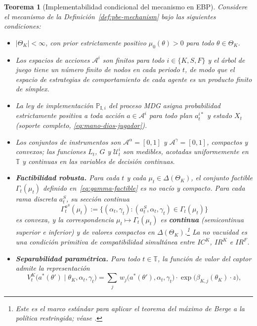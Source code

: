 \documentclass[12pt]{article}
\providecommand{\textcite}{\citet}
\newtheorem{theorem}{Teorema}[section]
\theoremstyle{definition}
\theoremstyle{remark}
\newcommand{\ProbI}[1]{\mathbb{P}_{\mathrm{I},#1}}
\newcommand{\1}{\mathbf{1}}
\begin{document}
\begin{theorem}[Implementabilidad condicional del mecanismo en EBP]
\label{thm:ebp-implementabilidad}
Considere el mecanismo de la Definición~\ref{def:pbe-mechanism} bajo las siguientes condiciones:
\begin{itemize}
  \item[\textup{(i)}] $|\Theta_K|<\infty$, con prior estrictamente positivo $\mu_0(\theta)>0$ para todo $\theta\in\Theta_K$.
  \item[\textup{(ii)}] Los espacios de acciones $\mathcal{A}^i$ son finitos para todo $i\in\{K,S,F\}$ y el árbol de juego tiene un número finito de nodos en cada periodo $t$, de modo que el espacio de estrategias de comportamiento de cada agente es un producto finito de símplex.
  \item[\textup{(iii)}] La ley de implementación $\ProbI{i}$ del proceso MDG asigna probabilidad estrictamente positiva a toda acción $a\in\mathcal{A}^i$ para todo plan $a_t^{i\ast}$ y estado $X_t$ \textup{(}soporte completo, \eqref{eq:mano-dios-jugador}\textup{)}.
  \item[\textup{(iv)}] Los conjuntos de instrumentos son $\mathcal{A}^{\alpha}=[0,1]$ y $\mathcal{A}^{\gamma}=[0,1]$, compactos y convexos; las funciones $L_t$, $G$ y $\mathcal{U}_t^i$ son medibles, acotadas uniformemente en $\mathbb{T}$ y continuas en las variables de decisión continuas.
  \item[\textup{(v)}] \textbf{Factibilidad robusta.} Para cada $t$ y cada $\mu_t\in\Delta(\Theta_K)$, el conjunto factible $\Gamma_t(\mu_t)$ definido en~\eqref{eq:gamma-factible} es no vacío y compacto. Para cada rama discreta $a_t^S$, su sección continua
  \[
  \Gamma_t^{a^S}(\mu_t):=\{(\alpha_t,\gamma_t):(a_t^S,\alpha_t,\gamma_t)\in\Gamma_t(\mu_t)\}
  \]
  es convexa, y la correspondencia $\mu_t\mapsto\Gamma_t(\mu_t)$ es \textbf{continua} \textup{(}semicontinua superior e inferior\textup{)} y de valores compactos en $\Delta(\Theta_K)$.\footnote{Este es el marco estándar para aplicar el teorema del máximo de Berge a la política restringida; véase \textcite{AliprantisBorder2006}.} La no vacuidad es una condición primitiva de compatibilidad simultánea entre $IC^K$, $IR^K$ e $IR^F$.
  \item[\textup{(vi)}] \textbf{Separabilidad paramétrica.} Para todo $t\in\mathbb{T}$, la función de valor del captor admite la representación
  \[
    V^K_t\!\bigl(a^\ast(\theta')\mid\theta_K,\alpha_t,\gamma_t\bigr)
    =
    \sum_{j}\,w_j\!\bigl(a^\ast(\theta'),\alpha_t,\gamma_t\bigr)
    \cdot\exp\!\bigl(\beta_{K,j}(\theta_K)\cdot z\bigr),
\]
\end{itemize}
\end{theorem}
\end{document}
